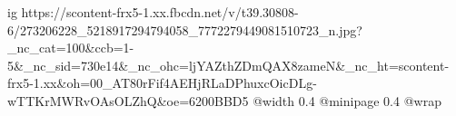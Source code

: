  
 
 
 
 

\ifcmt
  ig https://scontent-frx5-1.xx.fbcdn.net/v/t39.30808-6/273206228_5218917294794058_7772279449081510723_n.jpg?_nc_cat=100&ccb=1-5&_nc_sid=730e14&_nc_ohc=ljYAZthZDmQAX8zameN&_nc_ht=scontent-frx5-1.xx&oh=00_AT80rFif4AEHjRLaDPhuxcOicDLg-wTTKrMWRvOAsOLZhQ&oe=6200BBD5
  @width 0.4
  @minipage 0.4
  @wrap \parpic[r]
\fi
